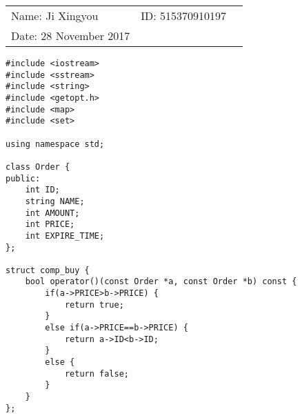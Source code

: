 \documentclass{article}
\begin{document}
\begin{spacing}{1.5}

\vspace*{0.25cm}

\hrulefill

\thispagestyle{empty}

\begin{center}
\begin{large}
\end{large}

\hrulefill

\vspace*{5cm}
\begin{Large}
\end{Large}

\vspace{2em}

\begin{large}
\end{large}
\end{center}


\vfill

\begin{table}[h!]
\flushleft
\begin{tabular}{lll}
Name: Ji Xingyou \hspace*{2em}&
ID: 515370910197\hspace*{2em}
\\

Date: 28 November 2017

\end{tabular}
\end{table}

\hfill
\newpage
\tableofcontents
\newpage
\begin{lstlisting}
#include <iostream>
#include <sstream>
#include <string>
#include <getopt.h>
#include <map>
#include <set>

using namespace std;

class Order {
public:
    int ID;
    string NAME;
    int AMOUNT;
    int PRICE;
    int EXPIRE_TIME;
};

struct comp_buy {
    bool operator()(const Order *a, const Order *b) const {
        if(a->PRICE>b->PRICE) {
            return true;
        }
        else if(a->PRICE==b->PRICE) {
            return a->ID<b->ID;
        }
        else {
            return false;
        }
    }
};


\end{lstlisting}
\end{spacing}
\end{document}
